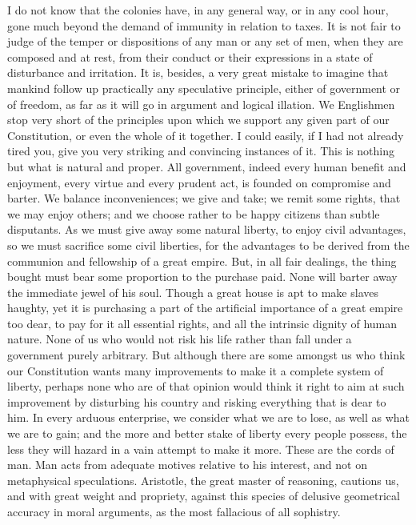 I do not know that the colonies have, in any general way, or in any cool hour, gone much beyond the demand of immunity in relation to taxes. It is not fair to judge of the temper or dispositions of any man or any set of men, when they are composed and at rest, from their conduct or their expressions in a state of disturbance and irritation. It is, besides, a very great mistake to imagine that mankind follow up practically any speculative principle, either of government or of freedom, as far as it will go in argument and logical illation. We Englishmen stop very short of the principles upon which we support any given part of our Constitution, or even the whole of it together. I could easily, if I had not already tired you, give you very striking and convincing instances of it. This is nothing but what is natural and proper. All government, indeed every human benefit and enjoyment, every virtue and every prudent act, is founded on compromise and barter. We balance inconveniences; we give and take; we remit some rights, that we may enjoy others; and we choose rather to be happy citizens than subtle disputants. As we must give away some natural liberty, to enjoy civil advantages, so we must sacrifice some civil liberties, for the advantages to be derived from the communion and fellowship of a great empire. But, in all fair dealings, the thing bought must bear some proportion to the purchase paid. None will barter away the immediate jewel of his soul. Though a great house is apt to make slaves haughty, yet it is purchasing a part of the artificial importance of a great empire too dear, to pay for it all essential rights, and all the intrinsic dignity of human nature. None of us who would not risk his life rather than fall under a government purely arbitrary. But although there are some amongst us who think our Constitution wants many improvements to make it a complete system of liberty, perhaps none who are of that opinion would think it right to aim at such improvement by disturbing his country and risking everything that is dear to him. In every arduous enterprise, we consider what we are to lose, as well as what we are to gain; and the more and better stake of liberty every people possess, the less they will hazard in a vain attempt to make it more. These are the cords of man. Man acts from adequate motives relative to his interest, and not on metaphysical speculations. Aristotle, the great master of reasoning, cautions us, and with great weight and propriety, against this species of delusive geometrical accuracy in moral arguments, as the most fallacious of all sophistry.

